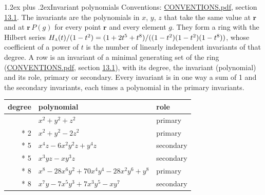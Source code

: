 \documentclass[10pt,a4paper]{article}
\makeatletter
\renewcommand\section{\@startsection{section}{1}{\z@}{-3ex plus -1ex minus -.2ex}%
  {1.2ex plus .2ex}{\normalfont\large\sffamily\bfseries\color{parttitle}}}
\numberwithin{equation}{section}
\newcommand{\irr}[1]{\text{\normalfont\scshape #1}}
\newcommand{\pointr}{\mathbf{r}}
\makeatother
\begin{document}
\section{Invariant polynomials}\label{s:invariant_polynomials}
Conventions: \href{../../CONVENTIONS.pdf}{CONVENTIONS.pdf}, section \href{../../CONVENTIONS.pdf\#conv.13.1}{13.1}.
The invariants are the polynomials in $x$, $y$, $z$ that take the same value at $\pointr$ and at $\pointr\,P(g)$ for every point $\pointr$ and every element $g$. They form a ring with the Hilbert series $H_{\irr{a}}(t)/(1-t^{2}) = (1 + 2t^{5} + t^{8})/((1-t^{2})(1-t^{2})(1-t^{8}))$, whose coefficient of a power of $t$ is the number of linearly independent invariants of that degree. \label{n:head.degree}\label{n:head.role}A row is an invariant of a minimal generating set of the ring (\href{../../CONVENTIONS.pdf}{CONVENTIONS.pdf}, section \href{../../CONVENTIONS.pdf\#conv.13.1}{13.1}), with its degree, the invariant (polynomial) and its role, primary or secondary. Every invariant is in one way a sum of 1 and the secondary invariants, each times a polynomial in the primary invariants.
{\small\begin{longtable}{@{}rll@{}}\toprule
degree & polynomial & role\\\midrule\endhead
\bottomrule\endfoot\endlastfoot
2 & $x^{2} + y^{2} + z^{2}$ & primary\\*
2 & $x^{2} + y^{2} - 2z^{2}$ & primary\\*
5 & $x^{4}z - 6x^{2}y^{2}z + y^{4}z$ & secondary\\*
5 & $x^{3}yz - xy^{3}z$ & secondary\\*
8 & $x^{8} - 28x^{6}y^{2} + 70x^{4}y^{4} - 28x^{2}y^{6} + y^{8}$ & primary\\*
8 & $x^{7}y - 7x^{5}y^{3} + 7x^{3}y^{5} - xy^{7}$ & secondary\\
\bottomrule\end{longtable}}
\end{document}
